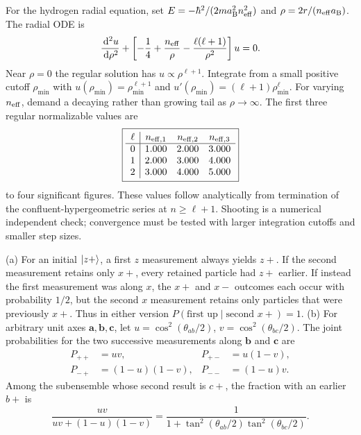 For the hydrogen radial equation, set
$E=-\hbar^2/(2ma_{\mathrm B}^2 n_{\rm eff}^2)$
and $\rho=2r/(n_{\rm eff}a_{\mathrm B})$.
The radial ODE is
\begin{equation}
\frac{\,\mathrm d^2u}{\,\mathrm d\rho^2}
+\left[-\frac14+\frac{n_{\rm eff}}{\rho}
-\frac{\ell(\ell+1)}{\rho^2}\right]u=0.
\end{equation}
Near $\rho=0$ the regular solution has
$u\propto\rho^{\ell+1}$.
Integrate from a small positive cutoff
$\rho_{\min}$ with
$u(\rho_{\min})=\rho_{\min}^{\ell+1}$
and $u'(\rho_{\min})=
(\ell+1)\rho_{\min}^\ell$.
For varying $n_{\rm eff}$, demand a
decaying rather than growing tail as
$\rho\to\infty$. The first three regular
normalizable values are
\begin{equation}
\boxed{\begin{array}{c|ccc}
\ell&n_{\rm eff,1}&n_{\rm eff,2}&n_{\rm eff,3}\\\hline
0&1.000&2.000&3.000\\
1&2.000&3.000&4.000\\
2&3.000&4.000&5.000
\end{array}}
\end{equation}
to four significant figures.
These values follow analytically from
termination of the confluent-hypergeometric
series at $n\ge\ell+1$. Shooting is
a numerical independent check; convergence
must be tested with larger integration
cutoffs and smaller step sizes.

(a) For an initial $\lvert z+\rangle$,
a first $z$ measurement always yields $z+$.
If the second measurement retains only
$x+$, every retained particle had $z+$
earlier. If instead the first measurement
was along $x$, the $x+$ and $x-$ outcomes
each occur with probability $1/2$,
but the second $x$ measurement retains only
particles that were previously $x+$.
Thus in either version
$\boxed{P(\text{first up}\mid\text{second }x+)=1}$.
(b) For arbitrary unit axes $\mathbf a,\mathbf b,
\mathbf c$, let
$u=\cos^2(\theta_{ab}/2)$,
$v=\cos^2(\theta_{bc}/2)$.
The joint probabilities for the two successive
measurements along $\mathbf b$ and $\mathbf c$
are
\begin{align}
P_{++}&=uv,&P_{+-}&=u(1-v),\\
P_{-+}&=(1-u)(1-v),&
P_{--}&=(1-u)v.
\end{align}
Among the subensemble whose second result is $c+$,
the fraction with an earlier $b+$ is
\begin{equation}
\boxed{\frac{uv}{uv+(1-u)(1-v)}
=\frac1{1+\tan^2(\theta_{ab}/2)
\tan^2(\theta_{bc}/2)}}.
\end{equation}

